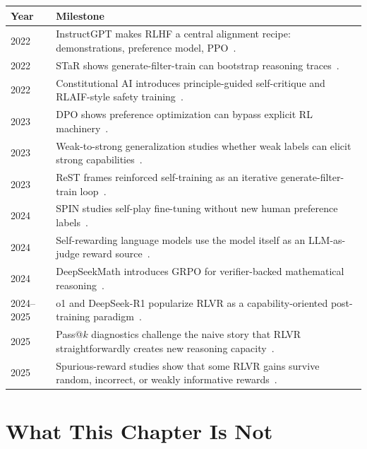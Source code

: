 \begin{center}
\begin{tabularx}{\textwidth}{@{}lX@{}}
\toprule
\textbf{Year} & \textbf{Milestone} \\
\midrule
2022 & InstructGPT makes RLHF a central alignment recipe: demonstrations, preference model, PPO~\cite{ouyang2022instructgpt}. \\
2022 & STaR shows generate-filter-train can bootstrap reasoning traces~\cite{zelikman2022star}. \\
2022 & Constitutional AI introduces principle-guided self-critique and RLAIF-style safety training~\cite{bai2022constitutional}. \\
2023 & DPO shows preference optimization can bypass explicit RL machinery~\cite{rafailov2023dpo}. \\
2023 & Weak-to-strong generalization studies whether weak labels can elicit strong capabilities~\cite{burns2023weak}. \\
2023 & ReST frames reinforced self-training as an iterative generate-filter-train loop~\cite{gulcehre2023rest}. \\
2024 & SPIN studies self-play fine-tuning without new human preference labels~\cite{chen2024spin}. \\
2024 & Self-rewarding language models use the model itself as an LLM-as-judge reward source~\cite{yuan2024selfrewarding}. \\
2024 & DeepSeekMath introduces GRPO for verifier-backed mathematical reasoning~\cite{shao2024deepseekmath}. \\
2024--2025 & o1 and DeepSeek-R1 popularize RLVR as a capability-oriented post-training paradigm~\cite{openai2024reasoning,deepseekai2025r1}. \\
2025 & Pass@$k$ diagnostics challenge the naive story that RLVR straightforwardly creates new reasoning capacity~\cite{yue2025rlreasoning}. \\
2025 & Spurious-reward studies show that some RLVR gains survive random, incorrect, or weakly informative rewards~\cite{liu2025spurious}. \\
\bottomrule
\end{tabularx}
\end{center}


\section{What This Chapter Is Not}
\label{sec:ch17-framing}

